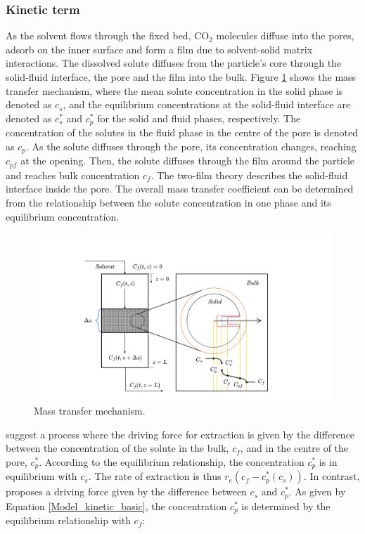 \documentclass[a4paper,fleqn]{cas-dc}
\begin{document}
		\subsubsection{Kinetic term} \label{CH: Kinetic}
		
		As the solvent flows through the fixed bed, CO$_2$ molecules diffuse into the pores, adsorb on the inner surface and form a film due to solvent-solid matrix interactions. The dissolved solute diffuses from the particle's core through the solid-fluid interface, the pore and the film into the bulk. Figure \ref{fig: SFE_Mechanism} shows the mass transfer mechanism, where the mean solute concentration in the solid phase is denoted as $c_s$, and the equilibrium concentrations at the solid-fluid interface are denoted as $c_s^*$ and $c_p^*$ for the solid and fluid phases, respectively. The concentration of the solutes in the fluid phase in the centre of the pore is denoted as $c_p$. As the solute diffuses through the pore, its concentration changes, reaching $c_{pf}$ at the opening. Then, the solute diffuses through the film around the particle and reaches bulk concentration $c_f$. The two-film theory describes the solid-fluid interface inside the pore. The overall mass transfer coefficient can be determined from the relationship between the solute concentration in one phase and its equilibrium concentration.
		
		\begin{figure}[h!]
			\centering
			\includegraphics[trim = 45cm 0cm 60cm 20cm,clip,width=0.85\columnwidth]{Figures/SFE_PFD.drawio.png}	
			\caption{Mass transfer mechanism.}
			\label{fig: SFE_Mechanism}
		\end{figure}
		
		\citet{Bulley1984} suggest a process where the driving force for extraction is given by the difference between the concentration of the solute in the bulk, $c_f$, and in the centre of the pore, $c_p^*$. According to the equilibrium relationship, the concentration $c_p^*$ is in equilibrium with $c_s$. The rate of extraction is thus $r_e\left(c_f - c^*_p(c_s)\right)$. In contrast, \citet{Reverchon1996} proposes a driving force given by the difference between $c_s$ and $c_p^*$. As given by Equation \ref{Model_kinetic_basic}, the concentration $c_p^*$ is determined by the equilibrium relationship with $c_f$:
		
\end{document}
